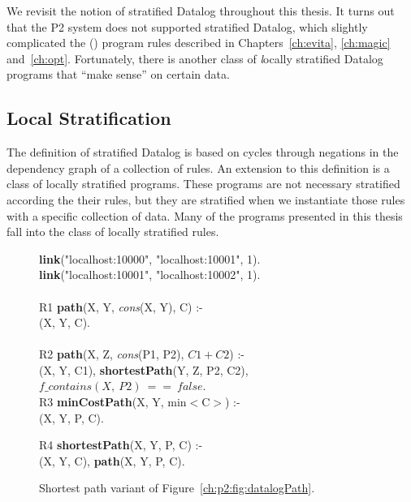 We revisit the notion of stratified Datalog throughout this thesis.  It turns
out that the P2 system does not supported stratified Datalog, which slightly
complicated the (\OVERLOG) program rules described in Chapters~\ref{ch:evita},
\ref{ch:magic} and~\ref{ch:opt}.  Fortunately, there is another class of {\emph
locally stratified} Datalog programs that ``make sense'' on certain data.

\subsection{Local Stratification}

The definition of stratified Datalog is based on cycles through negations in
the dependency graph of a collection of rules.  An extension to this definition
is a class of locally stratified programs.  These programs are not necessary
stratified according the their rules, but they are stratified when we
instantiate those rules with a specific collection of data.  Many of the
programs presented in this thesis fall into the class of locally stratified
rules.

\begin{figure}
\ssp
\begin{boxedminipage}{\linewidth}
{\bf link}("localhost:10000", "localhost:10001", 1). \\
{\bf link}("localhost:10001", "localhost:10002", 1). \\
\\
R1 {\bf path}(X, Y, {\em cons}(X, Y), C) :- \\
(X, Y, C). \\
\\       
R2 {\bf path}(X, Z, {\em cons}(P1, P2), $C1+C2$) :- \\
(X, Y, C1), {\bf shortestPath}(Y, Z, P2, C2), \\
\datalogspace $f\_contains(X,\ P2)\ ==\ false$. \\ 

R3 {\bf minCostPath}(X, Y, min$<$C$>$) :-  \\
(X, Y, P, C).

R4 {\bf shortestPath}(X, Y, P, C) :- \\
(X, Y, C), {\bf path}(X, Y, P, C).\\

\end{boxedminipage}
\caption{\label{ch:p2:fig:datalogSP}Shortest path variant of Figure~\ref{ch:p2:fig:datalogPath}.}
\end{figure}

